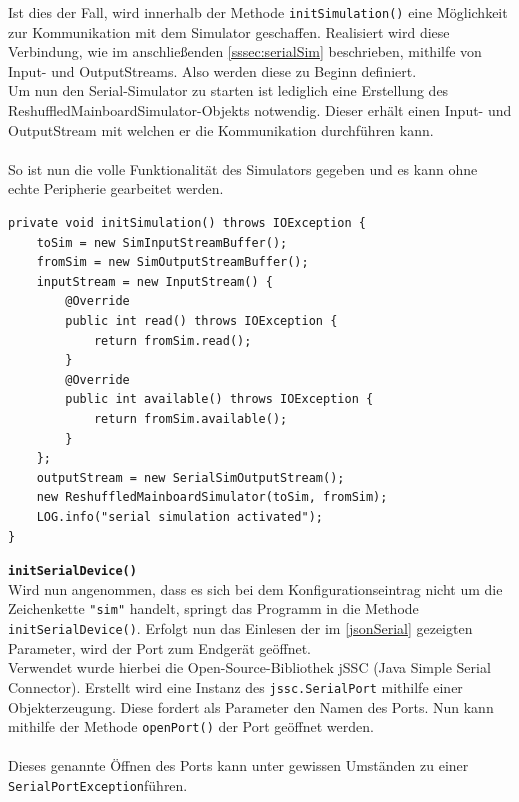 Ist dies der Fall, wird innerhalb der Methode \lstinline{initSimulation()} eine Möglichkeit zur Kommunikation mit dem Simulator geschaffen.
Realisiert wird diese Verbindung, wie im anschließenden \autoref{sssec:serialSim} beschrieben, mithilfe von Input- und OutputStreams.
Also werden diese zu Beginn definiert.\\
Um nun den Serial-Simulator zu starten ist lediglich eine Erstellung des ReshuffledMainboardSimulator-Objekts notwendig.
Dieser erhält einen Input- und OutputStream mit welchen er die Kommunikation durchführen kann.\\\\
So ist nun die volle Funktionalität des Simulators gegeben und es kann ohne echte Peripherie gearbeitet werden.
%
\begin{lstlisting}[style=java,caption=Methode initSimulation(),label=fdsafdsafds]
private void initSimulation() throws IOException {
    toSim = new SimInputStreamBuffer();
    fromSim = new SimOutputStreamBuffer();
    inputStream = new InputStream() {
        @Override
        public int read() throws IOException {
            return fromSim.read();
        }
        @Override
        public int available() throws IOException {
            return fromSim.available();
        }
    };
    outputStream = new SerialSimOutputStream();
    new ReshuffledMainboardSimulator(toSim, fromSim);
    LOG.info("serial simulation activated");
}
\end{lstlisting}
\textbf{\lstinline{initSerialDevice()}}
\\
Wird nun angenommen, dass es sich bei dem Konfigurationseintrag nicht um die Zeichenkette \lstinline[style=json]{"sim"} handelt, springt das Programm in die Methode \lstinline{initSerialDevice()}.
Erfolgt nun das Einlesen der im \autoref{jsonSerial} gezeigten Parameter, wird der Port zum Endgerät geöffnet.\\
Verwendet wurde hierbei die Open-Source-Bibliothek \acs{jSSC} (Java Simple Serial Connector).
Erstellt wird eine Instanz des \lstinline[style=java]{jssc.SerialPort} mithilfe einer Objekterzeugung.
Diese fordert als Parameter den Namen des Ports.
Nun kann mithilfe der Methode \lstinline{openPort()} der Port geöffnet werden.\\\\
Dieses genannte Öffnen des Ports kann unter gewissen Umständen zu einer \lstinline[style=java]{SerialPortException}führen.
